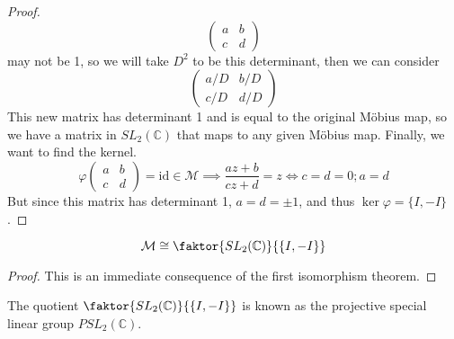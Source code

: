 \begin{proof}
\[\begin{pmatrix}
			a & b \\ c & d
		\end{pmatrix}
	\]
	may not be 1, so we will take \(D^2\) to be this determinant, then we can consider
	\[
		\begin{pmatrix}
			a/D & b/D \\ c/D & d/D
		\end{pmatrix}
	\]
	This new matrix has determinant 1 and is equal to the original M\"obius map, so we have a matrix in \(SL_2(\mathbb C)\) that maps to any given M\"obius map.
	Finally, we want to find the kernel.
	\[
		\varphi \begin{pmatrix}
			a & b \\ c & d
		\end{pmatrix} = \text{id} \in \mathcal M \implies \frac{az+b}{cz+d} = z \iff c = d = 0; a = d
	\]
	But since this matrix has determinant 1, \(a = d = \pm 1\), and thus \(\ker \varphi = \{ I, -I \}\).
\end{proof}
\begin{corollary}
	\[
		\mathcal M \cong \faktor{SL_2(\mathbb C)}{\{ I, -I \}}
	\]
\end{corollary}
\begin{proof}
	This is an immediate consequence of the first isomorphism theorem.
\end{proof}
The quotient \(\faktor{SL_2(\mathbb C)}{\{ I, -I \}}\) is known as the projective special linear group \(PSL_2(\mathbb C)\).

